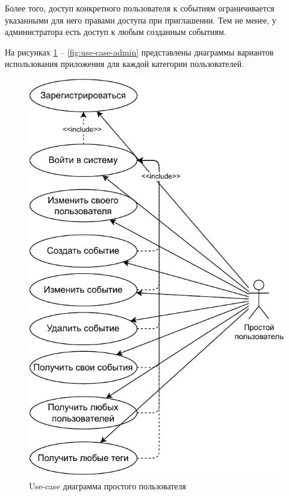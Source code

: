 Более того, доступ конкретного пользователя к событиям ограничивается указанными для него правами доступа при приглашении. Тем не менее, у администратора есть доступ к любым созданным событиям.

На рисунках \ref{fig:use-case-simple} -- \ref{fig:use-case-admin} представлены диаграммы вариантов использования приложения для каждой категории пользователей.

\begin{figure}[ht!]
	\centering
	\includegraphics[width=0.9\linewidth]{assets/images/Use-Case-Простой.pdf}
	\caption{Use-case диаграмма простого пользователя}
	\label{fig:use-case-simple}
\end{figure}


